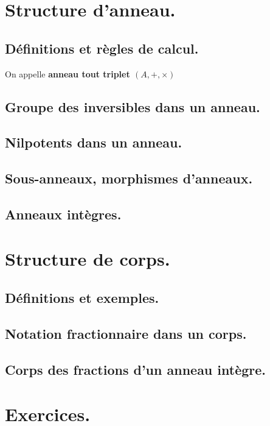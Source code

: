 \documentclass[11pt]{article}
\begin{document}
\section{Structure d'anneau.}

\subsection{Définitions et règles de calcul.}

\begin{defi}{}{}
    On appelle \bf{anneau} tout triplet $(A,+,\times)$
\end{defi}

\subsection{Groupe des inversibles dans un anneau.}
\subsection{Nilpotents dans un anneau.}
\subsection{Sous-anneaux, morphismes d'anneaux.}
\subsection{Anneaux intègres.}

\section{Structure de corps.}

\subsection{Définitions et exemples.}
\subsection{Notation fractionnaire dans un corps.}
\subsection{Corps des fractions d'un anneau intègre.}

\section{Exercices.}
\end{document}
